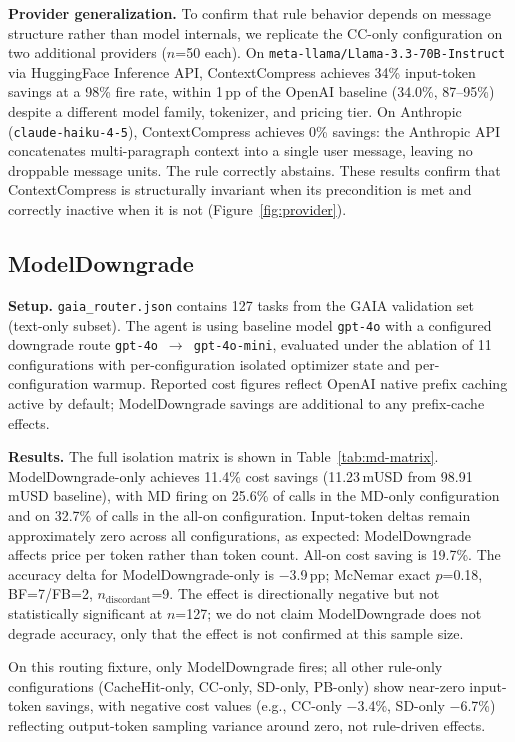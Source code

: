 \textbf{Provider generalization.} To confirm that rule behavior depends on message
structure rather than model internals, we replicate the CC-only configuration on two
additional providers ($n$=50 each). On
\texttt{meta\allowbreak-llama/Llama-3.3-70B-Instruct} via HuggingFace Inference API,
ContextCompress achieves 34\% input-token savings at a 98\% fire rate, within
1\,pp of the OpenAI baseline (34.0\%, 87--95\%) despite a different model family,
tokenizer, and pricing tier. On Anthropic (\texttt{claude-haiku-4-5}),
ContextCompress achieves 0\% savings: the Anthropic API concatenates multi-paragraph
context into a single user message, leaving no droppable message units. The rule
correctly abstains. These results confirm that ContextCompress is structurally
invariant when its precondition is met and correctly inactive when it is not
(Figure~\ref{fig:provider}).

\subsection{ModelDowngrade}
\label{sec:eval-md}

\textbf{Setup.} \texttt{gaia\_router.json} contains 127 tasks from the GAIA
validation set (text-only subset). The agent is 
using baseline model \texttt{gpt-4o} with a configured downgrade route
\texttt{gpt-4o}~$\rightarrow$~\texttt{gpt-4o-mini}, evaluated under the ablation of
11 configurations with per-configuration isolated optimizer state and per-configuration
warmup. Reported cost figures reflect OpenAI native prefix caching active by default;
ModelDowngrade savings are additional to any prefix-cache effects.

\textbf{Results.} The full isolation matrix is shown in Table~\ref{tab:md-matrix}.
ModelDowngrade-only achieves 11.4\% cost savings (11.23\,mUSD from 98.91\,mUSD
baseline), with MD firing on 25.6\% of calls in the MD-only configuration and on
32.7\% of calls in the all-on configuration. Input-token deltas remain approximately
zero across all configurations, as expected: ModelDowngrade affects price per token
rather than token count. All-on cost saving is 19.7\%. The accuracy delta for
ModelDowngrade-only is $-$3.9\,pp; McNemar exact $p$=0.18, BF=7/FB=2,
$n_{\mathrm{discordant}}$=9. The effect is directionally negative but not
statistically significant at $n$=127; we do not claim ModelDowngrade does not degrade
accuracy, only that the effect is not confirmed at this sample size.

On this routing fixture, only ModelDowngrade fires; all other rule-only
configurations (CacheHit-only, CC-only, SD-only, PB-only) show near-zero input-token
savings, with negative cost values (e.g., CC-only $-$3.4\%, SD-only $-$6.7\%)
reflecting output-token sampling variance around zero, not rule-driven effects.

